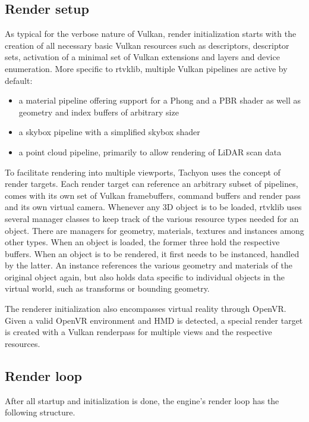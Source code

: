 \subsection{Render setup} 
As typical for the verbose nature of Vulkan, render initialization starts with the creation of all necessary basic Vulkan resources such as descriptors, descriptor sets, activation of a minimal set of Vulkan extensions and layers and device enumeration. 
More specific to rtvklib, multiple Vulkan pipelines are active by default:
\begin{itemize}
\item a material pipeline offering support for a Phong and a PBR shader as well as geometry and index buffers of arbitrary size
\item a skybox pipeline with a simplified skybox shader
\item a point cloud pipeline, primarily to allow rendering of LiDAR scan data
\end{itemize}
To facilitate rendering into multiple viewports, Tachyon uses the concept of render targets. Each render target can reference an arbitrary subset of pipelines, comes with its own set of Vulkan framebuffers, command buffers and render pass and its own virtual camera. 
Whenever any 3D object is to be loaded, rtvklib uses several manager classes to keep track of the various resource types needed for an object. There are managers for geometry, materials, textures and instances among other types. When an object is loaded, the former three hold the respective buffers. When an object is to be rendered, it first needs to be instanced, handled by the latter. An instance references the various geometry and materials of the original object again, but also holds data specific to individual objects in the virtual world, such as transforms or bounding geometry. 

The renderer initialization also encompasses virtual reality through OpenVR. Given a valid OpenVR environment and HMD is detected, a special render target is created with a Vulkan renderpass for multiple views and the respective resources. 

\subsection{Render loop} 
After all startup and initialization is done, the engine's render loop has the following structure. 


